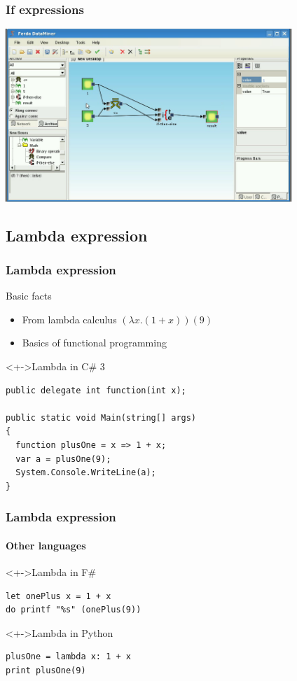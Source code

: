 \documentclass{beamer}
\begin{document}
\begin{frame}
	\frametitle{If expressions}
	\includegraphics[width=10.8cm]{ifthenelse2.png}
\end{frame}

\subsection{Lambda expression}
\begin{frame}[fragile]
	\frametitle{Lambda expression}
	\begin{block}{Basic facts}
		\begin{itemize}[<+->]
			\item From lambda calculus $(\lambda x.(1+x))(9)$
			\item Basics of functional programming
		\end{itemize}
	\end{block}
	\begin{block}<+->{Lambda in C\# 3}
\begin{verbatim}
public delegate int function(int x);

public static void Main(string[] args)
{
  function plusOne = x => 1 + x;
  var a = plusOne(9);
  System.Console.WriteLine(a);
}
\end{verbatim}
	\end{block}	
\end{frame}

\begin{frame}[fragile]
	\frametitle{Lambda expression}
	\framesubtitle{Other languages}
	\begin{block}<+->{Lambda in F\#}
\begin{verbatim}
let onePlus x = 1 + x
do printf "%s" (onePlus(9)) 
\end{verbatim}
	\end{block}	
	\begin{block}<+->{Lambda in Python}
\begin{verbatim}
plusOne = lambda x: 1 + x
print plusOne(9)
\end{verbatim}
	\end{block}	
\end{frame}
\end{document}
